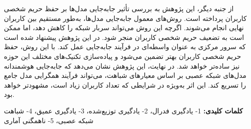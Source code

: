 \begin{small}
از جنبه دیگر، این پژوهش به بررسی تأثیر جابه‌جایی مدل‌ها بر حفظ حریم شخصی کاربران پرداخته است. روش‌های معمول جابه‌جایی مدل‌ها، به‌طور مستقیم بین کاربران نهایی انجام می‌شوند. اگرچه این روش می‌تواند سربار شبکه را کاهش دهد، اما ممکن است به تضعیف حریم شخصی کاربران منجر شود. در این پژوهش پیشنهاد شده است که سرور مرکزی به عنوان واسطه‌ای در فرآیند جابه‌جایی عمل کند. با این روش، حفظ حریم شخصی کاربران بهتر تضمین می‌شود و پیاده‌سازی تکنیک‌های مختلف این حوزه نیز ساده‌تر خواهد شد.
در نهایت، این پژوهش نشان می‌دهد که جابه‌جایی هوشمندانه مدل‌های شبکه عصبی بر اساس معیارهای شباهت، می‌تواند فرآیند همگرایی مدل جامع را تسریع کند. این اثر به‌ویژه در شرایطی که تعداد کاربران زیاد است، مشهودتر خواهد بود.



\vspace{5mm}
\noindent\textbf{کلمات کلیدی:}
1- یادگیری فدرال،
2- یادگیری توزیع‌شده،
3- یادگیری عمیق،
4- شباهت شبکه عصبی،
5- ناهمگنی آماری
\end{small}